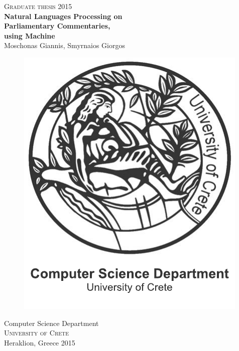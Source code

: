 \newpage
\restoregeometry
\thispagestyle{empty}
\mbox{}


\newpage
\thispagestyle{empty}
\begin{center}
	\textsc{\large Graduate thesis 2015}\\[4cm]		%
	\textbf{\Large Natural Languages Processing on\\Parliamentary Commentaries,\\using Machine} \\[1cm]
	{\large Moschonas Giannis, Smyrnaios Giorgos}
	
	\vfill	
	\begin{figure}[H]
	\centering
	\includegraphics[width=0.2\pdfpagewidth]{figure/auxiliary/logo_eng.pdf} \\	
	\end{figure}	\vspace{5mm}	
	
	Computer Science Department \\
	\textsc{University of Crete} \\
	Heraklion, Greece 2015 \\
\end{center}


